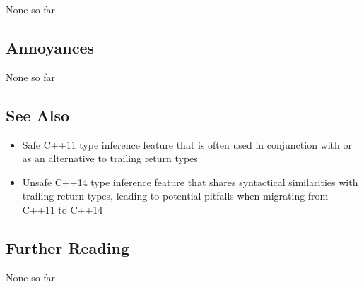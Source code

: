 None so far

\subsection[Annoyances]{Annoyances}\label{annoyances}

None so far

\subsection[See Also]{See Also}\label{see-also}

\begin{itemize}
\item{%
Safe C++11 type inference feature that is often used in conjunction with or as an alternative to trailing return types}
\item{%
Unsafe C++14 type inference feature that shares syntactical similarities with trailing return types, leading to potential pitfalls when migrating from C++11 to C++14}
\end{itemize}

\subsection[Further Reading]{Further Reading}\label{further-reading}

None so far


